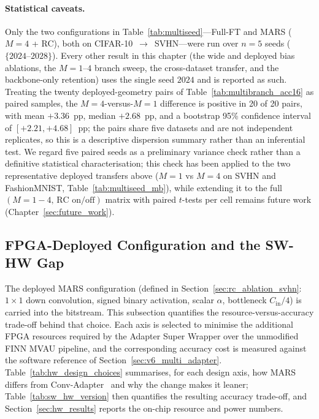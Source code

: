 \documentclass[12pt, a4paper]{report}
\numberwithin{equation}{chapter}
\numberwithin{figure}{chapter}
\numberwithin{table}{chapter}
\numberwithin{algorithm}{chapter}
\begin{document}
\paragraph{Statistical caveats.} Only the two configurations in Table~\ref{tab:multiseed}---Full-FT and MARS ($M=4$ + RC), both on CIFAR-10~$\to$~SVHN---were run over $n=5$ seeds ($\{2024\text{--}2028\}$). Every other result in this chapter (the wide and deployed bias ablations, the $M=1$--$4$ branch sweep, the cross-dataset transfer, and the backbone-only retention) uses the single seed $2024$ and is reported as such. Treating the twenty deployed-geometry pairs of Table~\ref{tab:multibranch_acc16} as paired samples, the $M{=}4$-versus-$M{=}1$ difference is positive in 20 of 20 pairs, with mean $+3.36$~pp, median $+2.68$~pp, and a bootstrap 95\% confidence interval of $[+2.21, +4.68]$~pp; the pairs share five datasets and are not independent replicates, so this is a descriptive dispersion summary rather than an inferential test. We regard five paired seeds as a preliminary variance check rather than a definitive statistical characterisation; this check has been applied to the two representative deployed transfers above ($M{=}1$ vs $M{=}4$ on SVHN and FashionMNIST, Table~\ref{tab:multiseed_mb}), while extending it to the full $(M=1{-}4,\,\text{RC on/off})$ matrix with paired $t$-tests per cell remains future work (Chapter~\ref{sec:future_work}).

\subsection{FPGA-Deployed Configuration and the SW-HW Gap}
\label{sec:sw_hw_gap}

The deployed MARS configuration (defined in Section~\ref{sec:rc_ablation_svhn}: $1\times 1$ down convolution, signed binary activation, scalar $\alpha$, bottleneck $C_{\text{in}}/4$) is carried into the bitstream. This subsection quantifies the resource-versus-accuracy trade-off behind that choice. Each axis is selected to minimise the additional FPGA resources required by the Adapter Super Wrapper over the unmodified FINN MVAU pipeline, and the corresponding accuracy cost is measured against the software reference of Section~\ref{sec:v6_multi_adapter}. Table~\ref{tab:hw_design_choices} summarises, for each design axis, how MARS differs from Conv-Adapter~\cite{Chen2024ConvAdapter} and why the change makes it leaner; Table~\ref{tab:sw_hw_version} then quantifies the resulting accuracy trade-off, and Section~\ref{sec:hw_results} reports the on-chip resource and power numbers.
\end{document}
